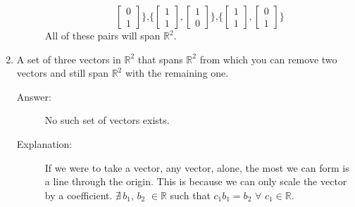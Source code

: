 \documentclass{article}
\begin{document}
\begin{enumerate}
\begin{description}
\[                                        \begin{bmatrix}0 \\ 1\end{bmatrix}
                                    \}\text{,}
                                    \{                                                                          
                                        \begin{bmatrix}1 \\ 1\end{bmatrix},
                                        \begin{bmatrix}1 \\ 0\end{bmatrix}
                                    \}\text{,}
                                    \{
                                        \begin{bmatrix}1 \\ 1\end{bmatrix},
                                        \begin{bmatrix}0 \\ 1\end{bmatrix}
                                    \}
                                    \]
                                    All of these pairs will span $\mathbb{R}^2$.
                            \end{description}
                        \item 
                            A set of three vectors in $\mathbb{R}^2$ that spans $\mathbb{R}^2$ from which you can remove two
                            vectors and still span $\mathbb{R}^2$ with the remaining one.
                            \begin{description}
                                \item[Answer:] 
                                    No such set of vectors exists.
                                \item[Explanation:]
                                    If we were to take a vector, any vector, alone, the most we can form is a line
                                    through the origin. This is because we can only scale the vector by a coefficient.
                                    $\nexists\,b_1$, $b_2$ $ \in \mathbb{R}$ such that $c_1b_1 = b_2$ $\forall$ $c_1 \in \mathbb{R}$.
                            \end{description}


                                    
                    \end{enumerate}
                        
                        
\clearpage


\end{document}
